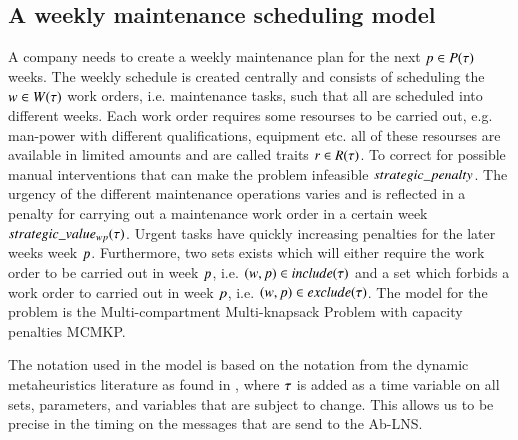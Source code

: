 \subsection{A weekly maintenance scheduling model}
\label{sub2sec2}
A company needs to create a weekly maintenance plan for the next $p \in P(\tau)$
weeks. The weekly schedule is created centrally and consists of scheduling the
$\ElementWorkOrder \in \SetWorkOrder$ work orders, i.e. maintenance tasks, such that all are scheduled into
different weeks. Each work order requires some resourses to be carried out, e.g.
man-power with different qualifications, equipment etc. all of these resourses
are available in limited amounts and are called traits $r \in R(\tau)$.
To correct for possible manual interventions that can make the problem infeasible 
$strategic\_penalty$. The urgency of the different maintenance operations varies and
is reflected in a penalty for carrying out a maintenance work order in a certain
week $strategic\_value_{w p}(\tau)$. Urgent tasks have quickly increasing penalties for the later
weeks week $p$. Furthermore, two sets exists which will either require the
work order to be carried out in week $p$, i.e. $(w,p) \in include(\tau)$ and a set which
forbids a work order to carried out in week $p$, i.e. $(w, p) \in exclude(\tau)$. The model
for the problem is the Multi-compartment Multi-knapsack Problem with capacity
penalties MCMKP.

The notation used in the model is based on the notation
from the dynamic metaheuristics literature as found in
\cite{yangMetaheuristicsDynamicCombinatorial2013}, where $\tau$ is added as a time
variable on all sets, parameters, and variables that are subject to change.
This allows us to be precise in the timing on the messages that are send to
the Ab-LNS.

